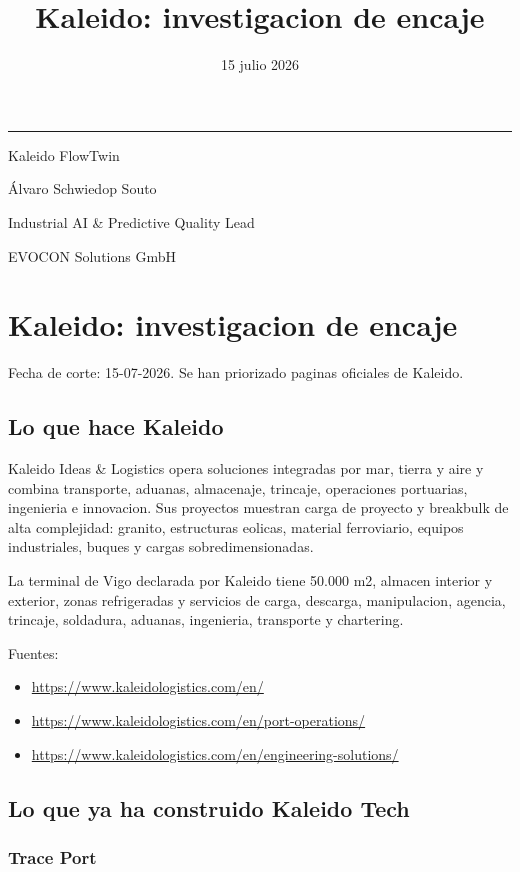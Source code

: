 \documentclass[
  spanish,
  10pt,
  a4paper,
]{article}
\title{Kaleido: investigacion de encaje}
\author{}
\date{15 julio 2026}
\makeatletter
\providecommand{\tightlist}{%
  \setlength{\itemsep}{0pt}\setlength{\parskip}{0pt}}
\renewcommand{\maketitle}{%
  \hypersetup{pageanchor=false}
  \begin{titlepage}
    \pagecolor{KaleidoNavy}
    \color{white}
    \vspace*{1.4cm}
    {\color{KaleidoCyan}\rule{2.4cm}{2.5pt}\par}
    \vspace{1.1cm}
    {\Huge\bfseries\@title\par}
    \vspace{0.65cm}
    {\Large\color{KaleidoMint}Kaleido FlowTwin\par}
    \vfill
    {\large Álvaro Schwiedop Souto\par}
    \vspace{0.15cm}
    {\normalsize\color{KaleidoMint}Industrial AI \& Predictive Quality Lead\par}
    \vspace{0.15cm}
    {\normalsize\color{KaleidoMint}EVOCON Solutions GmbH\par}
    \vspace{0.25cm}
    {\normalsize\color{KaleidoMint}\@date\par}
  \end{titlepage}
  \hypersetup{pageanchor=true}
  \nopagecolor
  \color{black}
}
\makeatother
\begin{document}
\maketitle

{
\setcounter{tocdepth}{3}
\tableofcontents
}
\section{Kaleido: investigacion de
encaje}\label{kaleido-investigacion-de-encaje}

Fecha de corte: 15-07-2026. Se han priorizado paginas oficiales de
Kaleido.

\subsection{Lo que hace Kaleido}\label{lo-que-hace-kaleido}

Kaleido Ideas \& Logistics opera soluciones integradas por mar, tierra y
aire y combina transporte, aduanas, almacenaje, trincaje, operaciones
portuarias, ingenieria e innovacion. Sus proyectos muestran carga de
proyecto y breakbulk de alta complejidad: granito, estructuras eolicas,
material ferroviario, equipos industriales, buques y cargas
sobredimensionadas.

La terminal de Vigo declarada por Kaleido tiene 50.000 m2, almacen
interior y exterior, zonas refrigeradas y servicios de carga, descarga,
manipulacion, agencia, trincaje, soldadura, aduanas, ingenieria,
transporte y chartering.

Fuentes:

\begin{itemize}
\tightlist
\item
  \url{https://www.kaleidologistics.com/en/}
\item
  \url{https://www.kaleidologistics.com/en/port-operations/}
\item
  \url{https://www.kaleidologistics.com/en/engineering-solutions/}
\end{itemize}

\subsection{Lo que ya ha construido Kaleido
Tech}\label{lo-que-ya-ha-construido-kaleido-tech}

\subsubsection{Trace Port}\label{trace-port}
\end{document}
